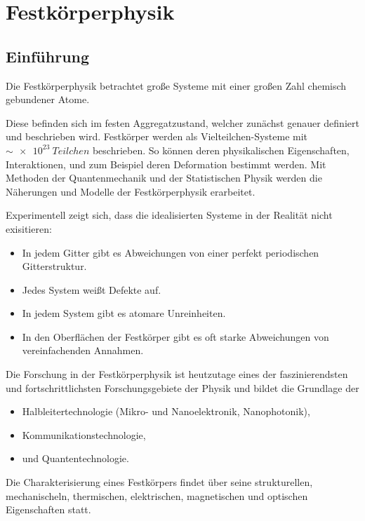 \clearpage
{}
\chapter{Festkörperphysik}
\label{chap:festkoerperphysik}
\clearpage

\section{Einführung}

Die Festkörperphysik betrachtet große Systeme mit einer großen Zahl chemisch gebundener Atome. 

Diese befinden sich im festen Aggregatzustand, welcher zunächst genauer definiert und beschrieben wird.
Festkörper werden als Vielteilchen-Systeme mit $\sim\SI{e23}{Teilchen}$ beschrieben.
So können deren physikalischen Eigenschaften, Interaktionen, und zum Beispiel deren Deformation bestimmt werden.
Mit Methoden der Quantenmechanik und der Statistischen Physik werden die Näherungen und Modelle der Festkörperphysik erarbeitet.

Experimentell zeigt sich, dass die idealisierten Systeme in der Realität nicht exisitieren:
\begin{itemize}
	\item In jedem Gitter gibt es Abweichungen von einer perfekt periodischen Gitterstruktur.
	\item Jedes System weißt Defekte auf.
	\item In jedem System gibt es atomare Unreinheiten.
	\item In den Oberflächen der Festkörper gibt es oft starke Abweichungen von vereinfachenden Annahmen.
\end{itemize}
Die Forschung in der Festkörperphysik ist heutzutage eines der faszinierendsten und fortschrittlichsten Forschungsgebiete der Physik und bildet die Grundlage der 
\begin{itemize}
	\item Halbleitertechnologie (Mikro- und Nanoelektronik, Nanophotonik),
	\item Kommunikationstechnologie,
	\item und Quantentechnologie.
\end{itemize}

Die Charakterisierung eines Festkörpers findet über seine strukturellen, mechanischeln, thermischen, elektrischen, magnetischen und optischen Eigenschaften statt.

